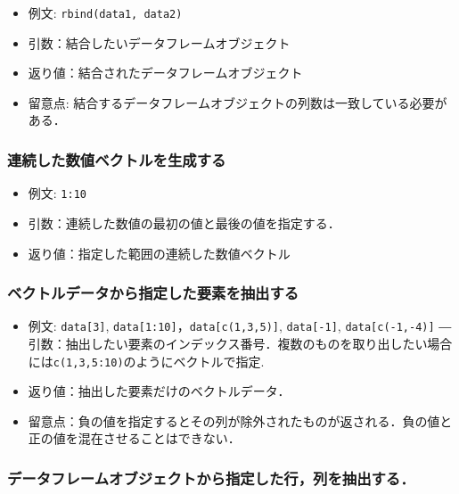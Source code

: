 \documentclass[
  xelatex, ja=standard]{bxjsarticle}
\providecommand{\tightlist}{%
  \setlength{\itemsep}{0pt}\setlength{\parskip}{0pt}}
\begin{document}
\begin{itemize}
\tightlist
\item
  例文: \texttt{rbind(data1,\ data2)}
\item
  引数：結合したいデータフレームオブジェクト
\item
  返り値：結合されたデータフレームオブジェクト
\item
  留意点:
  結合するデータフレームオブジェクトの列数は一致している必要がある．
\end{itemize}

\subsubsection{連続した数値ベクトルを生成する}\label{ux9023ux7d9aux3057ux305fux6570ux5024ux30d9ux30afux30c8ux30ebux3092ux751fux6210ux3059ux308b}

\begin{itemize}
\tightlist
\item
  例文: \texttt{1:10}
\item
  引数：連続した数値の最初の値と最後の値を指定する．
\item
  返り値：指定した範囲の連続した数値ベクトル
\end{itemize}

\subsubsection{ベクトルデータから指定した要素を抽出する}\label{ux30d9ux30afux30c8ux30ebux30c7ux30fcux30bfux304bux3089ux6307ux5b9aux3057ux305fux8981ux7d20ux3092ux62bdux51faux3059ux308b}

\begin{itemize}
\tightlist
\item
  例文: \texttt{data{[}3{]}},
  \texttt{data{[}1:10{]}}，\texttt{data{[}c(1,3,5){]}},
  \texttt{data{[}-1{]}}, \texttt{data{[}c(-1,-4){]}} ―
  引数：抽出したい要素のインデックス番号．複数のものを取り出したい場合には\texttt{c(1,3,5:10)}のようにベクトルで指定.
\item
  返り値：抽出した要素だけのベクトルデータ．
\item
  留意点：負の値を指定するとその列が除外されたものが返される．負の値と正の値を混在させることはできない．
\end{itemize}

\subsubsection{データフレームオブジェクトから指定した行，列を抽出する．}\label{ux30c7ux30fcux30bfux30d5ux30ecux30fcux30e0ux30aaux30d6ux30b8ux30a7ux30afux30c8ux304bux3089ux6307ux5b9aux3057ux305fux884cux5217ux3092ux62bdux51faux3059ux308b}
\end{document}
